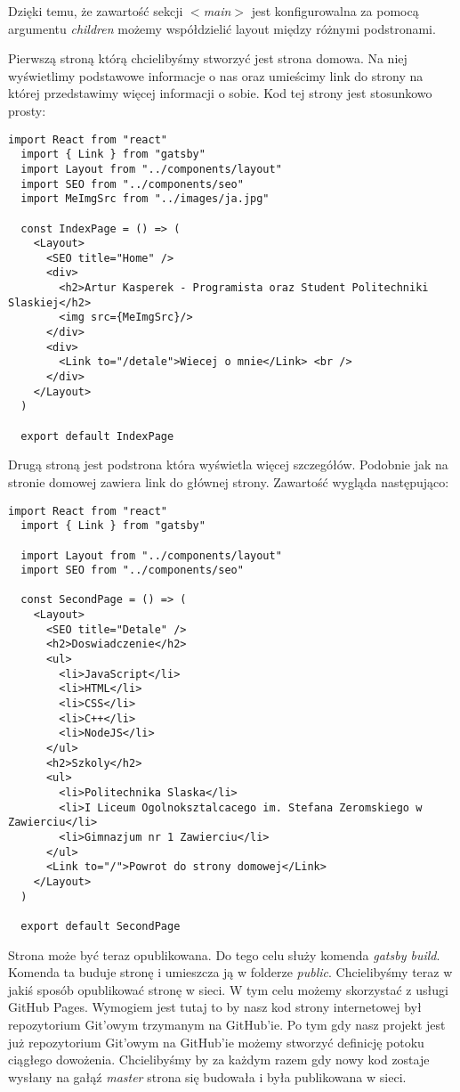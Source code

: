 Dzięki temu, że zawartość sekcji \textit{$<$main$>$} jest konfigurowalna za pomocą argumentu \textit{children} możemy współdzielić layout między różnymi podstronami.
\par
Pierwszą stroną którą chcielibyśmy stworzyć jest strona domowa. Na niej wyświetlimy podstawowe informacje o nas oraz umieścimy link do strony na której przedstawimy więcej informacji o sobie. Kod tej strony jest stosunkowo prosty:
\begin{lstlisting}[caption={index.js - plik zawiera treść strony domowej}]
  import React from "react"
  import { Link } from "gatsby"
  import Layout from "../components/layout"
  import SEO from "../components/seo"
  import MeImgSrc from "../images/ja.jpg"

  const IndexPage = () => (
    <Layout>
      <SEO title="Home" />
      <div>
        <h2>Artur Kasperek - Programista oraz Student Politechniki Slaskiej</h2>
        <img src={MeImgSrc}/>
      </div>
      <div>
        <Link to="/detale">Wiecej o mnie</Link> <br />
      </div>
    </Layout>
  )

  export default IndexPage
\end{lstlisting}
Drugą stroną jest podstrona która wyświetla więcej szczegółów. Podobnie jak na stronie domowej zawiera link do głównej strony. Zawartość wygląda następująco:
\begin{lstlisting}[caption={detale.js - plik zawiera treść strony z szczegółami}]
  import React from "react"
  import { Link } from "gatsby"

  import Layout from "../components/layout"
  import SEO from "../components/seo"

  const SecondPage = () => (
    <Layout>
      <SEO title="Detale" />
      <h2>Doswiadczenie</h2>
      <ul>
        <li>JavaScript</li>
        <li>HTML</li>
        <li>CSS</li>
        <li>C++</li>
        <li>NodeJS</li>
      </ul>
      <h2>Szkoly</h2>
      <ul>
        <li>Politechnika Slaska</li>
        <li>I Liceum Ogolnoksztalcacego im. Stefana Zeromskiego w Zawierciu</li>
        <li>Gimnazjum nr 1 Zawierciu</li>
      </ul>
      <Link to="/">Powrot do strony domowej</Link>
    </Layout>
  )

  export default SecondPage

\end{lstlisting}
\par
Strona może być teraz opublikowana. Do tego celu służy komenda \textit{gatsby build}. Komenda ta buduje stronę i umieszcza ją w folderze \textit{public}. Chcielibyśmy teraz w jakiś sposób opublikować stronę w sieci. W tym celu możemy skorzystać z usługi GitHub Pages. Wymogiem jest tutaj to by nasz kod strony internetowej był repozytorium Git'owym trzymanym na GitHub'ie. Po tym gdy nasz projekt jest już repozytorium Git'owym na GitHub'ie możemy stworzyć definicję potoku ciągłego dowożenia. Chcielibyśmy by za każdym razem gdy nowy kod zostaje wysłany na gałąź \textit{master} strona się budowała i była publikowana w sieci.
